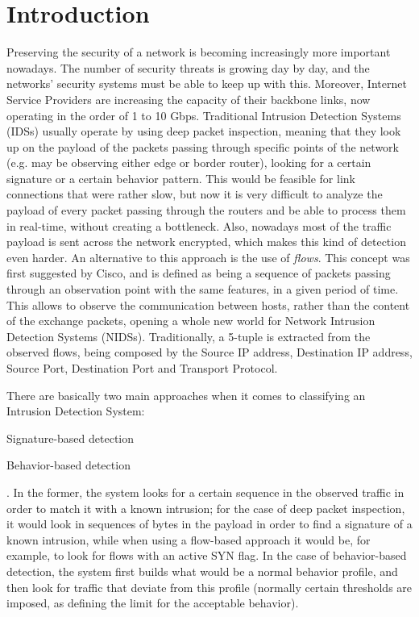 \documentclass[runningheads,a4paper]{llncs}
\begin{document}



\tableofcontents

\section{Introduction}\label{sec:intro}

Preserving the security of a network is becoming increasingly more important nowadays. The number of security threats is growing day by day, and the networks' security systems must be able to keep up with this. Moreover, Internet Service Providers are increasing the capacity of their backbone links, now operating in the order of 1 to 10 Gbps. Traditional Intrusion Detection Systems (IDSs) usually operate by using deep packet inspection, meaning that they look up on the payload of the packets passing through specific points of the network (e.g. may be observing either edge or border router), looking for a certain signature or a certain behavior pattern. This would be feasible for link connections that were rather slow, but now it is very difficult to analyze the payload of every packet passing through the routers and be able to process them in real-time, without creating a bottleneck. Also, nowadays most of the traffic payload is sent across the network encrypted, which makes this kind of detection even harder. An alternative to this approach is the use of \textit{flows}. This concept was first suggested by Cisco, and is defined as being a sequence of packets passing through an observation point with the same features, in a given period of time. This allows to observe the communication between hosts, rather than the content of the exchange packets, opening a whole new world for Network Intrusion Detection Systems (NIDSs). Traditionally, a 5-tuple is extracted from the observed flows, being composed by the Source IP address, Destination IP address, Source Port, Destination Port and Transport Protocol. 

There are basically two main approaches when it comes to classifying an Intrusion Detection System:
\begin{enumerate*}
\item Signature-based detection
\item Behavior-based detection
\end{enumerate*}. In the former, the system looks for a certain sequence in the observed traffic in order to match it with a known intrusion; for the case of deep packet inspection, it would look in sequences of bytes in the payload in order to find a signature of a known intrusion, while when using a flow-based approach it would be, for example, to look for flows with an active SYN flag. In the case of behavior-based detection, the system first builds what would be a normal behavior profile, and then look for traffic that deviate from this profile (normally certain thresholds are imposed, as defining the limit for the acceptable behavior). 
\end{document}
